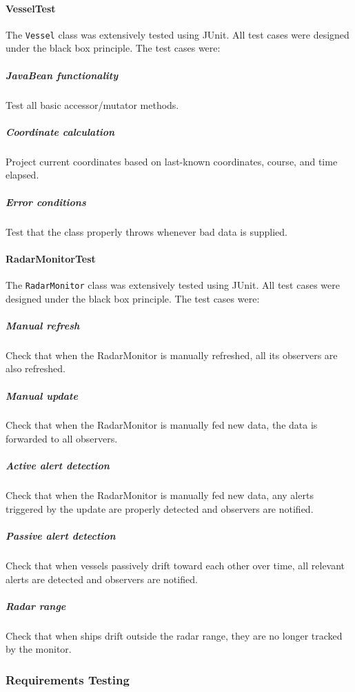 \documentclass{article}
\begin{document}
\paragraph{VesselTest}

The \verb|Vessel| class was extensively tested using JUnit. All test cases were designed under the black box principle. The test cases were:

\subparagraph{JavaBean functionality}
Test all basic accessor/mutator methods.

\subparagraph{Coordinate calculation}
Project current coordinates based on last-known coordinates, course, and time elapsed.

\subparagraph{Error conditions}
Test that the class properly throws whenever bad data is supplied.

\paragraph{RadarMonitorTest}

The \verb|RadarMonitor| class was extensively tested using JUnit. All test cases were designed under the black box principle. The test cases were:

\subparagraph{Manual refresh}
Check that when the RadarMonitor is manually refreshed, all its observers are also refreshed.

\subparagraph{Manual update}
Check that when the RadarMonitor is manually fed new data, the data is forwarded to all observers.

\subparagraph{Active alert detection}
Check that when the RadarMonitor is manually fed new data, any alerts triggered by the update are properly detected and observers are notified.

\subparagraph{Passive alert detection}
Check that when vessels passively drift toward each other over time, all relevant alerts are detected and observers are notified.

\subparagraph{Radar range}
Check that when ships drift outside the radar range, they are no longer tracked by the monitor.

\subsubsection{Requirements Testing}

\end{document}
